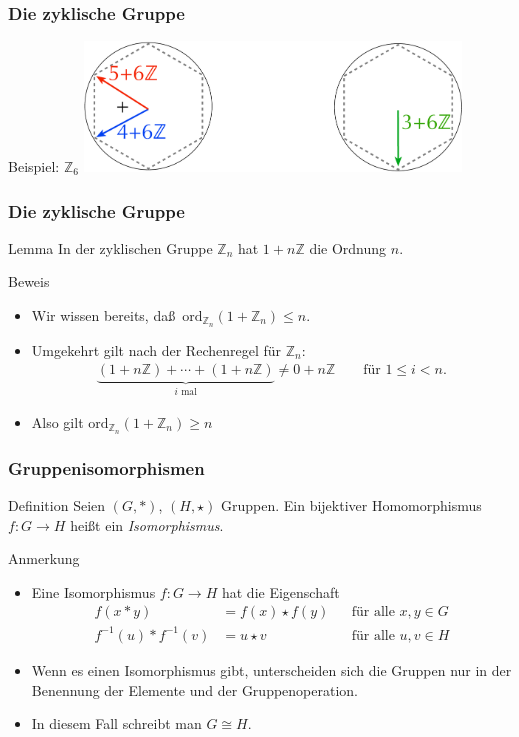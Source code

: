 \documentclass{beamer}
\renewcommand{\emph}[1]{{\textcolor{solarizedRed}{\itshape #1}}}
\newcommand\ZZ{\mathbb Z}
\newcommand{\ord}{\mathrm{ord}}
\newcommand{\ue}{\"u}
\begin{document}
\begin{frame}\frametitle{Die zyklische Gruppe}
	\begin{block}{Beispiel: $\ZZ_6$}
		\centering\includegraphics[width=100mm]{pics/cyclicGroup2.pdf}
	\end{block}
\end{frame}

\begin{frame}\frametitle{Die zyklische Gruppe}
	\begin{block}{Lemma}
		In der zyklischen Gruppe $\ZZ_n$ hat $1+n\ZZ$ die Ordnung $n$.
	\end{block}
	\begin{block}{Beweis}
		\begin{itemize}
			\item Wir wissen bereits, da\ss\ $\ord_{\ZZ_n}(1+\ZZ_n)\leq n$.
			\item Umgekehrt gilt nach der Rechenregel f\ue r $\ZZ_n$:
				\begin{align*}
					\underbrace{(1+n\ZZ)+\cdots+(1+n\ZZ)}_{\mbox{$i$ mal}}\neq0+n\ZZ\qquad\mbox{f\ue r }1\leq i<n.
				\end{align*}
			\item Also gilt $\ord_{\ZZ_n}(1+\ZZ_n)\geq n$
		\end{itemize}
	\end{block}
\end{frame}

\begin{frame}\frametitle{Gruppenisomorphismen}
	\begin{overprint}
		\begin{block}{Definition}
			Seien $(G,*)$, $(H,\star)$ Gruppen.
			Ein bijektiver Homomorphismus $f:G\to H$ hei\ss t ein \emph{Isomorphismus}.
		\end{block}
		\begin{block}{Anmerkung}
			\begin{itemize}
				\item Eine Isomorphismus $f:G\to H$ hat die Eigenschaft
					\begin{align*}
						f(x*y)&=f(x)\star f(y)&&\mbox{f\ue r alle }x,y\in G\\
						f^{-1}(u)*f^{-1}(v)&=u\star v&&\mbox{f\ue r alle }u,v\in H
					\end{align*}
				\item Wenn es einen Isomorphismus gibt, unterscheiden sich die Gruppen nur in der Benennung der Elemente und der Gruppenoperation.
				\item In diesem Fall schreibt man $G\cong H$.
			\end{itemize}
		\end{block}
	\end{overprint}
\end{frame}
\end{document}
